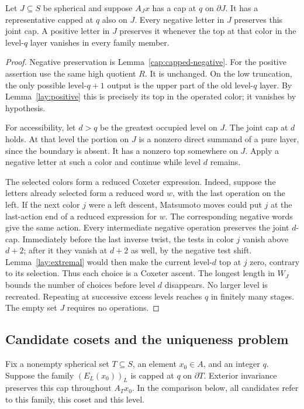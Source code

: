 \begin{lemma}
\label{cap:access}
Let $J\subseteq S$ be spherical and suppose $A_Jx$ has a cap at $q$
on $\partial J$.  It has a representative capped at $q$ also on $J$.
Every negative letter in $J$ preserves this joint cap.  A positive
letter in $J$ preserves it whenever the top at that color in the
level-$q$ layer vanishes in every family member.
\end{lemma}
\begin{proof}
Negative preservation is Lemma~\ref{cap:capped-negative}.  For the
positive assertion use the same high quotient $R$.  It is unchanged.
On the low truncation, the only possible level-$q+1$ output is the
upper part of the old level-$q$ layer.  By Lemma~\ref{lay:positive}
this is precisely its top in the operated color; it vanishes by
hypothesis.

For accessibility, let $d>q$ be the greatest occupied level on $J$.
The joint cap at $d$ holds.  At that level the portion on $J$ is a
nonzero direct summand of a pure layer, since the boundary is absent.
It has a nonzero top somewhere on $J$.  Apply a negative letter at
such a color and continue while level $d$ remains.

The selected colors form a reduced Coxeter expression.  Indeed,
suppose the letters already selected form a reduced word $w$, with
the last operation on the left.  If the next color $j$ were a left
descent, Matsumoto moves could put $j$ at the last-action end of a
reduced expression for $w$.  The corresponding negative words give
the same action.  Every intermediate negative operation preserves
the joint $d$-cap.  Immediately before the last inverse twist, the
tests in color $j$ vanish above $d+2$; after it they vanish at $d+2$
as well, by the negative test shift.  Lemma~\ref{lay:extremal} would
then make the current level-$d$ top at $j$ zero, contrary to its
selection.  Thus each choice is a Coxeter ascent.  The longest length
in $W_J$ bounds the number of choices before level $d$ disappears.
No larger level is recreated.  Repeating at successive excess
levels reaches $q$ in finitely many stages.  The empty set $J$
requires no operations.
\end{proof}

\subsection{Candidate cosets and the uniqueness problem}

Fix a nonempty spherical set $T\subseteq S$, an element $x_0\in A$,
and an integer $q$.  Suppose the family $(E_L(x_0))_L$ is capped at
$q$ on $\partial T$.  Exterior invariance preserves this cap
throughout $A_Tx_0$.  In the comparison below, all candidates refer to this
family, this coset and this level.


